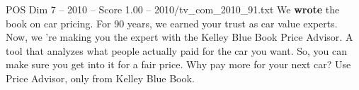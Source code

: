 \begin{textsample}{POS Dim 7 – 2010 – Score 1.00 – 2010/tv\_com\_2010\_91.txt}  \label{ex:f7_pos_072}
We \textbf{wrote} the book on car pricing.
For 90 years, we earned your trust as car value experts.
Now, we 're making you the expert with the Kelley Blue Book Price Advisor.
A tool that analyzes what people actually paid for the car you want.
So, you can make sure you get into it for a fair price.
Why pay more for your next car?
Use Price Advisor, only from Kelley Blue Book.

\end{textsample}
